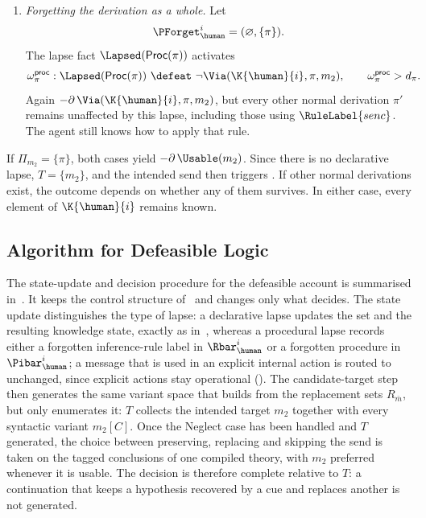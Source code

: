 \begin{example}
\begin{enumerate}
    \item[b.] \emph{Forgetting the derivation as a whole.} Let
    \[
        \PForget_{\human}^{i}=(\varnothing,\{\pi\}).
    \]
    The lapse fact $\Lapsed(\mathsf{Proc}(\pi))$ activates
    \[
        \omega^{\mathsf{proc}}_\pi:
        \Lapsed(\mathsf{Proc}(\pi))
        \ \defeat\ \neg\Via(\K{\human}{i},\pi,m_2),
        \qquad \omega^{\mathsf{proc}}_\pi>d_\pi.
    \]
    Again $-\partial\,\Via(\K{\human}{i},\pi,m_2)$, but every other normal derivation $\pi'$ remains unaffected by this lapse, including those using $\RuleLabel{senc}$. The agent still knows how to apply that rule.
\end{enumerate}

If $\Pi_{m_2}=\{\pi\}$, both cases yield $-\partial\,\Usable(m_2)$. Since there is no declarative lapse, $T=\{m_2\}$, and the intended send then triggers \skipmutation{}. If other normal derivations exist, the outcome depends on whether any of them survives. In either case, every element of $\K{\human}{i}$ remains known.
\end{example}

\subsection{Algorithm for Defeasible Logic}
\label{Subsec:AlgorithmDL}

The state-update and decision procedure for the defeasible account is summarised in~. It keeps the control structure of~ and changes only what decides. The state update distinguishes the type of lapse: a declarative lapse updates the \Forget{} set and the resulting knowledge state, exactly as in~, whereas a procedural lapse records either a forgotten inference-rule label in $\Rbar_{\human}^{i}$ or a forgotten procedure in $\Pibar_{\human}^{i}$; a message that is used in an explicit internal action is routed to \neglect{} unchanged, since explicit actions stay operational (). The candidate-target step then generates the same variant space that  builds from the replacement sets $R_{\bar{m}}$, but only enumerates it: $T$ collects the intended target $m_2$ together with every syntactic variant $m_2[C]$. Once the Neglect case has been handled and $T$ generated, the choice between preserving, replacing and skipping the send is taken on the tagged conclusions of one compiled theory, with $m_2$ preferred whenever it is usable. The decision is therefore complete relative to $T$: a continuation that keeps a hypothesis recovered by a cue and replaces another is not generated.

